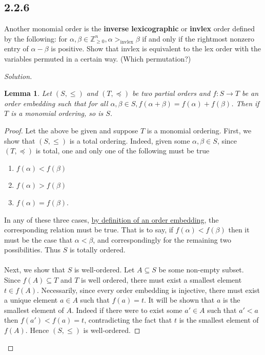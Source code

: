 \documentclass[]{article}
\newtheorem{lemma}{Lemma}
\newcommand\<{\langle}
\renewcommand\>{\rangle}
\newcommand{\ZZ}{\ensuremath{\mathbb{Z}}}
\newenvironment{solution}
{
	\begin{proof}[Solution] \text{ }
		\\
	}
	{
	\end{proof}
}
\begin{document}
\subsection*{2.2.6} Another monomial order is the \textbf{inverse lexicographic} or \textbf{invlex} order defined by the following: for $\alpha, \beta \in \ZZ_{\geq 0}^{n}, \alpha >_{\text{invlex}} \beta$ if and only if the rightmost nonzero entry of $\alpha - \beta$ is positive. Show that invlex is equivalent to the lex order with the variables permuted in a certain way. (Which permutation?)
\begin{solution}
	\begin{lemma}
		Let $\left(S, \leq\right)$ and $\left(T, \preceq\right)$ be two partial orders and $f : S \to T$ be an order embedding such that for all $\alpha, \beta \in S, f(\alpha + \beta) = f(\alpha) + f(\beta)$. Then if $T$ is a monomial ordering, so is $S$.
	\end{lemma}
	\begin{proof}
		Let the above be given and suppose $T$ is a monomial ordering. First, we show that $\left(S, \leq\right)$ is a total ordering. Indeed, given some $\alpha, \beta \in S$, since $\left(T, \preceq\right)$ is total, one and only one of the following must be true
		\begin{enumerate}
			\item $f(\alpha) < f(\beta)$
			\item $f(\alpha) > f(\beta)$
			\item $f(\alpha) = f(\beta)$.
		\end{enumerate}
		In any of these three cases, \href{https://en.wikipedia.org/wiki/Order_embedding}{by definition of an order embedding}, the corresponding relation must be true. That is to say, if $f(\alpha) < f(\beta)$ then it must be the case that $\alpha < \beta$, and correspondingly for the remaining two possibilities. Thus $S$ is totally ordered.
		\\
		\\
		Next, we show that $S$ is well-ordered. Let $A \subseteq S$ be some non-empty subset. Since $f(A) \subseteq T$ and $T$ is well ordered, there must exist a smallest element $t \in f(A)$. Necessarily, since every order embedding is injective, there must exist a unique element $a \in A$ such that $f(a) = t$. It will be shown that $a$ is the smallest element of $A$. Indeed if there were to exist some $a' \in A$ such that $a' < a$ then $f(a') < f(a) = t$, contradicting the fact that $t$ is the smallest element of $f(A)$. Hence $\left(S, \leq\right)$ is well-ordered.

\end{proof}
\end{solution}
\end{document}
